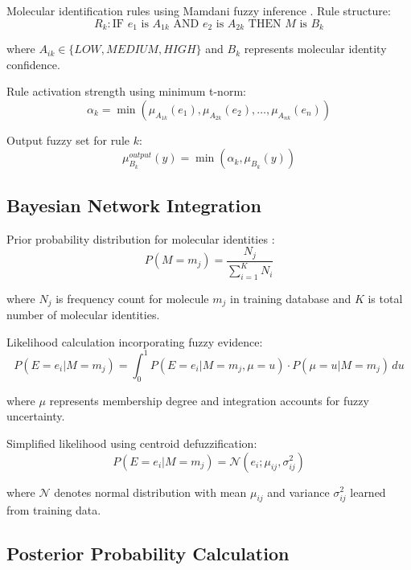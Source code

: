 Molecular identification rules using Mamdani fuzzy inference \cite{mamdani1975experiment}. Rule structure:
\begin{equation}
R_k: \text{IF } e_1 \text{ is } A_{1k} \text{ AND } e_2 \text{ is } A_{2k} \text{ THEN } M \text{ is } B_k
\end{equation}

where $A_{ik} \in \{LOW, MEDIUM, HIGH\}$ and $B_k$ represents molecular identity confidence.

Rule activation strength using minimum t-norm:
\begin{equation}
\alpha_k = \min(\mu_{A_{1k}}(e_1), \mu_{A_{2k}}(e_2), \ldots, \mu_{A_{nk}}(e_n))
\end{equation}

Output fuzzy set for rule $k$:
\begin{equation}
\mu_{B_k}^{output}(y) = \min(\alpha_k, \mu_{B_k}(y))
\end{equation}

\subsection{Bayesian Network Integration}

Prior probability distribution for molecular identities \cite{laplace1814essai}:
\begin{equation}
P(M = m_j) = \frac{N_j}{\sum_{i=1}^K N_i}
\end{equation}

where $N_j$ is frequency count for molecule $m_j$ in training database and $K$ is total number of molecular identities.

Likelihood calculation incorporating fuzzy evidence:
\begin{equation}
P(E = e_i | M = m_j) = \int_0^1 P(E = e_i | M = m_j, \mu = u) \cdot P(\mu = u | M = m_j) \, du
\end{equation}

where $\mu$ represents membership degree and integration accounts for fuzzy uncertainty.

Simplified likelihood using centroid defuzzification:
\begin{equation}
P(E = e_i | M = m_j) = \mathcal{N}(e_i; \mu_{ij}, \sigma_{ij}^2)
\end{equation}

where $\mathcal{N}$ denotes normal distribution with mean $\mu_{ij}$ and variance $\sigma_{ij}^2$ learned from training data.

\subsection{Posterior Probability Calculation}

